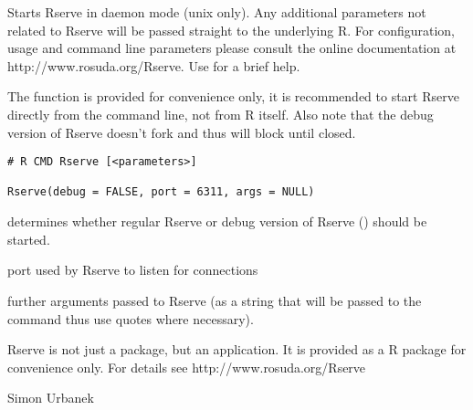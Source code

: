 \begin{Description}\relax
Starts Rserve in daemon mode (unix only). Any additional parameters
not related to Rserve will be passed straight to the underlying R. For
configuration, usage and command line parameters please consult the
online documentation at http://www.rosuda.org/Rserve. Use  for a brief help.

The  function is provided for convenience only, it is
recommended to start Rserve directly from the command line, not from R
itself. Also note that the debug version of Rserve doesn't fork and thus
will block until closed.
\end{Description}
\begin{Usage}
\begin{verbatim}
# R CMD Rserve [<parameters>]

Rserve(debug = FALSE, port = 6311, args = NULL)
\end{verbatim}
\end{Usage}
\begin{Arguments}
\begin{ldescription}
\item[\code{debug}] determines whether regular Rserve or debug version of
Rserve () should be started.
\item[\code{port}] port used by Rserve to listen for connections
\item[\code{args}] further arguments passed to Rserve (as a string that will be
passed to the  command thus use quotes where necessary).
\end{ldescription}
\end{Arguments}
\begin{Details}\relax
Rserve is not just a package, but an application. It is provided as a
R package for convenience only. For details see
http://www.rosuda.org/Rserve
\end{Details}
\begin{Author}\relax
Simon Urbanek
\end{Author}

